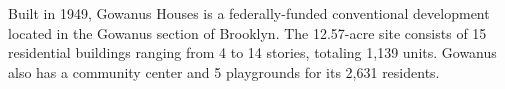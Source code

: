  

Built in 1949, Gowanus Houses is a federally-funded conventional development located in the Gowanus section of Brooklyn. The 12.57-acre site consists of 15 residential buildings ranging from 4 to 14 stories, totaling 1,139 units. Gowanus also has a community center and 5 playgrounds for its 2,631 residents. 